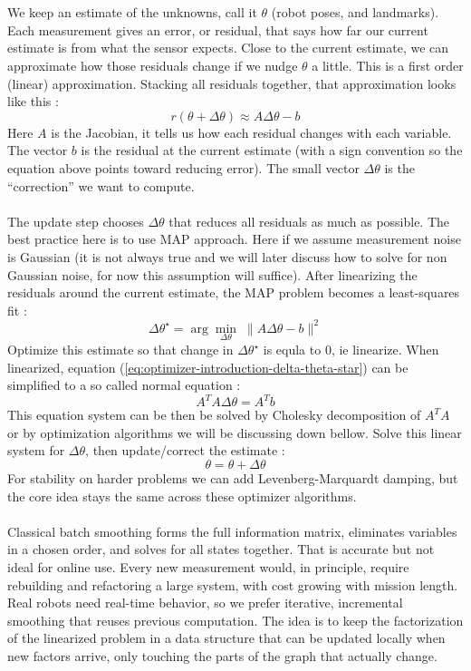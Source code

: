 \\ \\
We keep an estimate of the unknowns, call it $\theta$ (robot poses, and landmarks). Each measurement gives an error, or residual, that says how far our current estimate is from what the sensor expects. Close to the current estimate, we can approximate how those residuals change if we nudge $\theta$ a little. This is a first order (linear) approximation. Stacking all residuals together, that approximation looks like this \cite{iSAM_paper}:
$$
    r(\theta + \Delta\theta) \approx A\Delta\theta - b
$$
Here $A$ is the Jacobian, it tells us how each residual changes with each variable. The vector $b$ is the residual at the current estimate (with a sign convention so the equation above points toward reducing error). The small vector $\Delta\theta$ is the ``correction'' we want to compute. \cite{iSAM_paper}
\\ \\
The update step chooses $\Delta\theta$ that reduces all residuals as much as possible. The best practice here is to use \gls{MAP} approach. Here if we assume measurement noise is Gaussian (it is not always true and we will later discuss how to solve for non Gaussian noise, for now this assumption will suffice). After linearizing the residuals around the current estimate, the \gls{MAP} problem becomes a least-squares fit \cite{iSAM_paper}:
\begin{equation}
    \Delta\theta^\star = \arg\min_{\Delta\theta}\; \|A\Delta\theta - b\|^2
    \label{eq:optimizer-introduction-delta-theta-star}
\end{equation}
Optimize this estimate so that change in $\Delta\theta^\star$ is equla to 0, ie linearize. When linearized, equation (\ref{eq:optimizer-introduction-delta-theta-star}) can be simplified to a so called normal equation \cite{iSAM_paper}:
$$
    A^{T}A\Delta\theta = A^{T}b
$$
This equation system can be then be solved by Cholesky decomposition of $A^{T}A$ or by optimization algorithms we will be discussing down bellow. Solve this linear system for $\Delta\theta$, then update/correct the estimate \cite{iSAM_paper}:
$$
    \theta = \theta + \Delta\theta
$$
For stability on harder problems we can add Levenberg-Marquardt damping, but the core idea stays the same across these optimizer algorithms. \cite{iSAM2_paper}
\\ \\
Classical batch smoothing forms the full information matrix, eliminates variables in a chosen order, and solves for all states together. That is accurate but not ideal for online use. Every new measurement would, in principle, require rebuilding and refactoring a large system, with cost growing with mission length. Real robots need real-time behavior, so we prefer iterative, incremental smoothing that reuses previous computation. The idea is to keep the factorization of the linearized problem in a data structure that can be updated locally when new factors arrive, only touching the parts of the graph that actually change.
